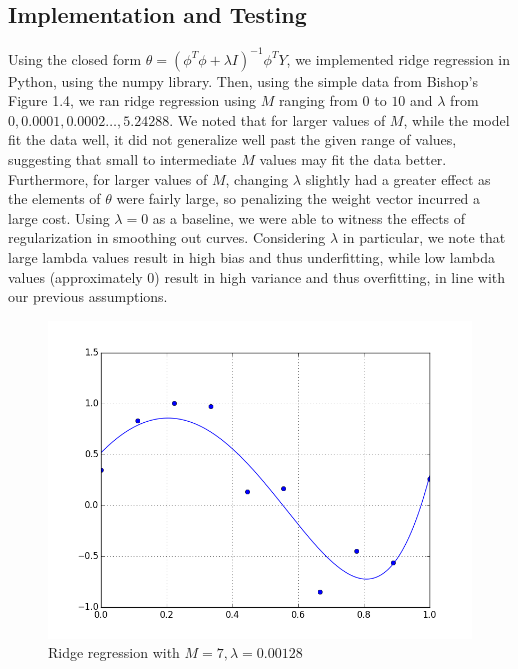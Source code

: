 \documentclass{article}
\begin{document}
\subsection{Implementation and Testing}
Using the closed form $\theta = (\phi ^ {T} \phi + \lambda I)^{-1} \phi ^ T Y$, we implemented ridge regression in Python, using the numpy library. Then, using the simple data from Bishop's Figure 1.4, we ran ridge regression using $M$ ranging from $0$ to $10$ and $\lambda$ from $0, 0.0001, 0.0002 \dots, 5.24288$. We noted that for larger values of $M$, while the model fit the data well, it did not generalize well past the given range of values, suggesting that small to intermediate $M$ values may fit the data better. Furthermore, for larger values of $M$, changing $\lambda$ slightly had a greater effect as the elements of $\theta$ were fairly large, so penalizing the weight vector incurred a large cost. Using $\lambda = 0$ as a baseline, we were able to witness the effects of regularization in smoothing out curves. Considering $\lambda$ in particular, we note that large lambda values result in high bias and thus underfitting, while low lambda values (approximately 0) result in high variance and thus overfitting, in line with our previous assumptions.

\begin{figure}
\label{p3figure1}
\includegraphics[scale=0.4]{bishop7.png}
\caption{Ridge regression with $M = 7, \lambda = 0.00128$}
\end{figure}
\end{document}
